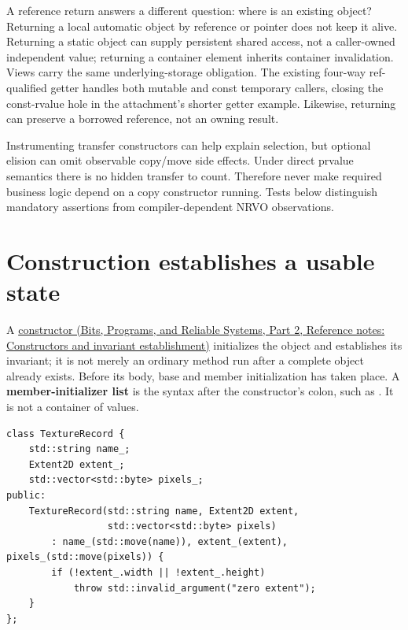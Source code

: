 A reference return answers a different question: where is an existing object? Returning a local automatic object by reference or pointer does not keep it alive. Returning a static object can supply persistent shared access, not a caller-owned independent value; returning a container element inherits container invalidation. Views carry the same underlying-storage obligation. The existing four-way ref-qualified getter handles both mutable and const temporary callers, closing the const-rvalue hole in the attachment's shorter getter example. Likewise,  returning  can preserve a borrowed reference, not an owning result.

Instrumenting transfer constructors can help explain selection, but optional elision can omit observable copy/move side effects. Under direct prvalue semantics there is no hidden transfer to count. Therefore never make required business logic depend on a copy constructor running. Tests below distinguish mandatory assertions from compiler-dependent NRVO observations.

\section{Construction establishes a usable state}\label{05-engine-i-ch003-construction-establishes-a-usable-state}

\hypertarget{05-engine-i-ch003-construction-establishes-a-usable-state}{}

A \href{../01-Bits-Programs-and-Reliable-Systems-P02/main.pdf\#nameddest=appendix-7f8ec83d0886}{constructor (Bits, Programs, and Reliable Systems, Part 2, Reference notes: Constructors and invariant establishment)} initializes the object and establishes its invariant; it is not merely an ordinary method run after a complete object already exists. Before its body, base and member initialization has taken place. A \textbf{member-initializer list} is the syntax after the constructor's colon, such as . It is not a  container of values.

\begin{verbatim}
class TextureRecord {
    std::string name_;
    Extent2D extent_;
    std::vector<std::byte> pixels_;
public:
    TextureRecord(std::string name, Extent2D extent,
                  std::vector<std::byte> pixels)
        : name_(std::move(name)), extent_(extent), pixels_(std::move(pixels)) {
        if (!extent_.width || !extent_.height)
            throw std::invalid_argument("zero extent");
    }
};
\end{verbatim}

